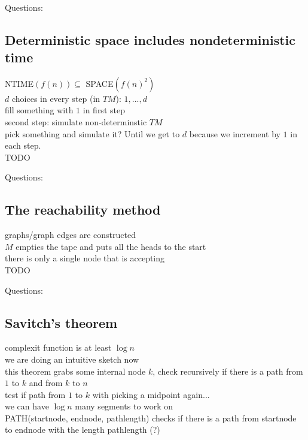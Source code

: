 \documentclass[a4]{scrartcl}
\begin{document}
\ \\
\color{violet} Questions:
\color{black}






\subsection*{Deterministic space includes nondeterministic time}
NTIME$(f(n)) \subseteq$ SPACE$(f(n)^2)$ \\
$d$ choices in every step (in $TM$): $1,...,d$ \\
fill something with $1$ in first step \\
second step: simulate non-determinstic $TM$ \\
pick something and simulate it? %
Until we get to $d$ because we increment by $1$ in each step. \\



\color{red} TODO
\color{black}

\color{violet} Questions:
\color{black}





\subsection*{The reachability method}
graphs/graph edges are constructed \\
$M$ empties the tape and puts all the heads to the start \\
there is only a single node that is accepting \\



\color{red} TODO
\color{black}

\color{violet} Questions:
\color{black}



\subsection*{Savitch's theorem}
complexit function is at least $\log n$ \\
we are doing an intuitive sketch now \\
this theorem grabs some internal node $k$, check recursively if there is a path from $1$ to $k$ and from $k$ to $n$ \\
test if path from $1$ to $k$ with picking a midpoint again... \\
we can have $\log n$ many segments to work on \\
PATH(startnode, endnode, pathlength) checks if there is a path from startnode to endnode with the length pathlength (?) \\
\end{document}
